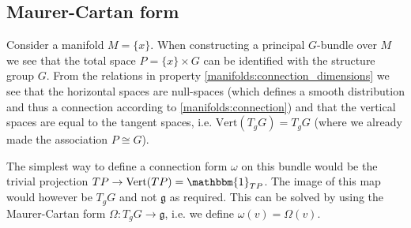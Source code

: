 	
\subsection{Maurer-Cartan form}

	
	\begin{definition}
		Consider a manifold $M = \{x\}$. When constructing a principal $G$-bundle over $M$ we see that the total space $P = \{x\}\times G$ can be identified with the structure group $G$. From the relations in property \ref{manifolds:connection_dimensions} we see that the horizontal spaces are null-spaces (which defines a smooth distribution and thus a connection according to \ref{manifolds:connection}) and that the vertical spaces are equal to the tangent spaces, i.e. $\text{Vert}(T_gG) = T_gG$ (where we already made the association $P\cong G$).
		
		The simplest way to define a connection form $\omega$ on this bundle would be the trivial projection $TP\rightarrow\text{Vert}(TP) = \mathbbm{1}_{TP}$. The image of this map would however be $T_gG$ and not $\mathfrak{g}$ as required. This can be solved by using the Maurer-Cartan form $\Omega:T_gG\rightarrow\mathfrak{g}$, i.e. we define $\omega(v) = \Omega(v)$.
	\end{definition}
	
